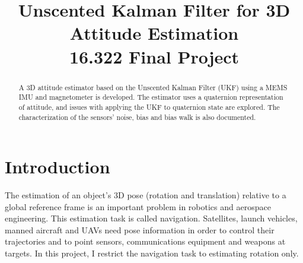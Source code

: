 \documentclass[conference]{IEEEtran}
\begin{document}
%
\title{Unscented Kalman Filter for 3D Attitude Estimation\\16.322 Final Project}


\author{
}


\maketitle

\begin{abstract}
A 3D attitude estimator based on the Unscented Kalman Filter (UKF) using a MEMS IMU and magnetometer is developed. The estimator uses a quaternion representation of attitude, and issues with applying the UKF to quaternion state are explored. The characterization of the sensors' noise, bias and bias walk is also documented.
\end{abstract}





%
\IEEEpeerreviewmaketitle



\section{Introduction}
The estimation of an object's 3D pose (rotation and translation) relative to a global reference frame is an important problem in robotics and aerospace engineering. This estimation task is called navigation. Satellites, launch vehicles, manned aircraft and UAVs need pose information in order to control their trajectories and to point sensors, communications equipment and weapons at targets. In this project, I restrict the navigation task to estimating rotation only.\\
\end{document}
